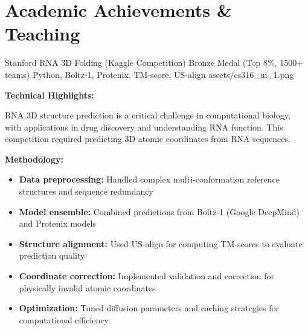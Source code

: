 
\section*{Academic Achievements \& Teaching}


\ProjectEntry
{Stanford RNA 3D Folding (Kaggle Competition)}
{Bronze Medal (Top 8\%, 1500+ teams)}
{Python, Boltz-1, Protenix, TM-score, US-align}
{
}
{assets/cs316_ui_1.png}
{ \quad {}}
{   }

\vspace{1em}

\textbf{Technical Highlights:}

RNA 3D structure prediction is a critical challenge in computational biology, with applications in drug discovery and understanding RNA function. This competition required predicting 3D atomic coordinates from RNA sequences.

\textbf{Methodology:}
\begin{itemize}[leftmargin=1.2em, itemsep=0.1em]
  \item \textbf{Data preprocessing:} Handled complex multi-conformation reference structures and sequence redundancy
  \item \textbf{Model ensemble:} Combined predictions from Boltz-1 (Google DeepMind) and Protenix models
  \item \textbf{Structure alignment:} Used US-align for computing TM-scores to evaluate prediction quality
  \item \textbf{Coordinate correction:} Implemented validation and correction for physically invalid atomic coordinates
  \item \textbf{Optimization:} Tuned diffusion parameters and caching strategies for computational efficiency
\end{itemize}

